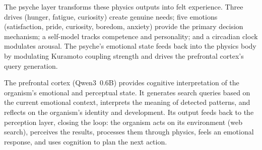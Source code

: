 \documentclass[11pt,a4paper,twocolumn]{article}
\begin{document}
The psyche layer transforms these physics outputs into felt experience.
Three drives (hunger, fatigue, curiosity) create genuine needs; five emotions (satisfaction, pride, curiosity, boredom, anxiety) provide the primary decision mechanism; a self-model tracks competence and personality; and a circadian clock modulates arousal.
The psyche's emotional state feeds back into the physics body by modulating Kuramoto coupling strength and drives the prefrontal cortex's query generation.

The prefrontal cortex (Qwen3~0.6B) provides cognitive interpretation of the organism's emotional and perceptual state.
It generates search queries based on the current emotional context, interprets the meaning of detected patterns, and reflects on the organism's identity and development.
Its output feeds back to the perception layer, closing the loop: the organism acts on its environment (web search), perceives the results, processes them through physics, feels an emotional response, and uses cognition to plan the next action.
\end{document}
